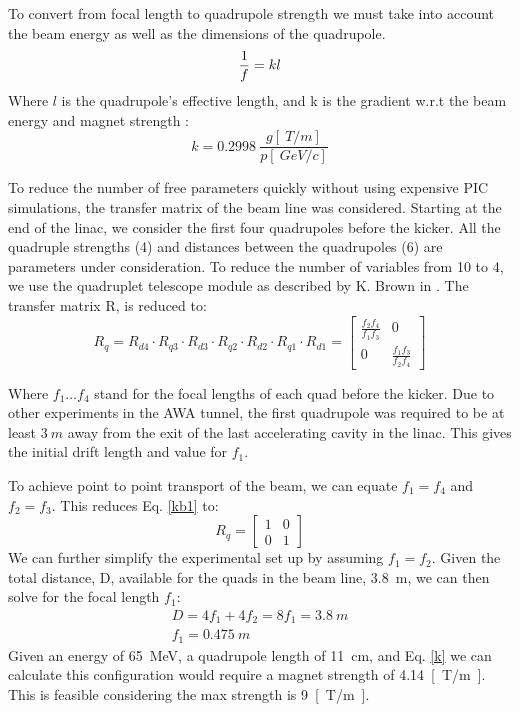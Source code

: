 To convert from focal length to quadrupole strength we must take into account the 
beam energy as well as the dimensions of the quadrupole. 
\begin{equation}
	\frac{1}{f} = kl \\
\end{equation}
Where $l$ is the quadrupole's effective length, and k is the gradient w.r.t 
the beam energy and magnet strength \cite{Wiedemann}:
\begin{equation}
	k = \SI{0.2998}{} \frac{g[\SI{}{T/m}]}{p [\SI{}{GeV/c}]}\label{k}
\end{equation}


 To reduce the number of free parameters quickly without using expensive PIC simulations, 
 the transfer matrix of the beam line was considered. Starting at the end of the linac, 
 we consider the first four quadrupoles before the kicker. All the quadruple strengths (4) and
 distances between the quadrupoles (6) are parameters under consideration. To reduce the number
 of variables from 10 to 4, we use the quadruplet telescope module as described by K. Brown in \cite{brown}.  The transfer matrix R, is reduced to:  
 \begin{equation}
 R_q = R_{d4} \cdot R_{q3} \cdot R_{d3} \cdot R_{q2} \cdot R_{d2} \cdot R_{q1} \cdot R_{d1} = 
 \begin{bmatrix}
 \frac{f_2 f_4}{f_1 f_3} & 0 \\
 0 & \frac{f_1 f_3}{f_2 f_4}	
 \end{bmatrix}\label{kb1}
 \end{equation}

Where $f_1 \ldots f_4$ stand for the focal lengths of each quad before the kicker. 
Due to other experiments in the AWA tunnel, 
the first quadrupole was required to be at least $\SI{3}{m}$ away from the exit of the 
last accelerating cavity in the linac. This gives the initial drift length and value
for $f_1$. 

To achieve point to point transport of the beam, we can 
equate $f_1 = f_4$ and $f_2 = f_3$. This reduces Eq. \ref{kb1} to:
 \begin{equation}
R_q =
\begin{bmatrix}
1 & 0 \\
0 & 1	
\end{bmatrix}
\end{equation}
We can further simplify the experimental set up by 
assuming $f_1=f_2$. Given the total distance, D, available for the
quads in the beam line, \SI{3.8}{m}, we can then solve
for the focal length $f_1$: 
\begin{align}
	D = 4f_1 + 4 f_2 = 8f_1 = \SI{3.8}{m} \\
	f_1 = \SI{0.475}{m}
\end{align}
Given an energy of \SI{65}{MeV}, a quadrupole length of \SI{11}{cm}, 
and Eq. \ref{k} we can calculate this configuration would require a 
magnet strength of \SI{4.14}{[T/m]}. This is feasible considering the 
max strength is \SI{9}{[T/m]}.

